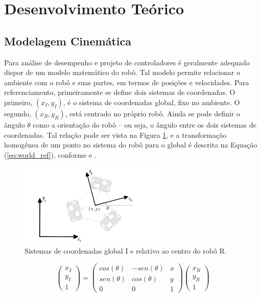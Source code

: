 \section{Desenvolvimento Teórico}
\label{sec:teorico}

\subsection{Modelagem Cinemática}

Para análise de desempenho e projeto de controladores é geralmente adequado dispor de um modelo matemático do robô. Tal modelo permite relacionar o ambiente com o robô e suas partes, em termos de posições e velocidades. Para referenciamento, primeiramente se define dois sistemas de coordenadas. O primeiro, $(x_I,y_I)$, é o sistema de coordenadas global, fixo no ambiente. O segundo, $(x_R,y_R)$, está centrado no próprio robô. Ainda se pode definir o ângulo $\theta$ como a orientação do robô -- ou seja, o ângulo entre os dois sistemas de coordenadas. Tal relação pode ser vista na Figura \ref{fig:ref}, e a transformação homogênea de um ponto no sistema do robô para o global é descrita na Equação (\ref{eq:world_ref}), conforme \citet{siegwart2011introduction} e \citet{ritter2016modelagem}.

\begin{figure}[h]
  \centering
  \includegraphics[width = 0.65\textwidth]{imagens/ref}
  \caption{Sistemas de coordenadas global I e relativo ao centro do robô R.}
  \label{fig:ref}
\end{figure}

\begin{equation}
  \begin{pmatrix}
    x_I \\
    y_I \\
    1
  \end{pmatrix}
  =
  \begin{pmatrix}
    cos (\theta) & -sen (\theta) & x \\
    sen(\theta)  &  cos (\theta) & y \\
    0          & 0          & 1
  \end{pmatrix}
  \begin{pmatrix}
    x_R \\
    y_R \\
    1
  \end{pmatrix}
  \label{eq:world_ref}
\end{equation}

